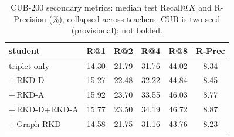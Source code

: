\documentclass[11pt,letterpaper]{article}
\begin{document}
\begin{table}[htbp]
    \centering\small
    \caption{CUB-200 secondary metrics: median test Recall@$K$ and R-Precision (\%),
             collapsed across teachers. CUB is two-seed (provisional); not bolded.}
    \label{tab:recall-cub}
    \begin{tabular}{lccccc}
        \toprule
        student & R@1 & R@2 & R@4 & R@8 & R-Prec \\
        \midrule
        triplet-only    & 14.30 & 21.79 & 31.76 & 44.02 & 8.34 \\
        +\,RKD-D        & 15.27 & 22.48 & 32.22 & 44.84 & 8.45 \\
        +\,RKD-A        & 15.92 & 23.70 & 33.55 & 46.03 & 8.77 \\
        +\,RKD-D+RKD-A  & 15.77 & 23.50 & 34.19 & 46.72 & 8.87 \\
        +\,Graph-RKD    & 14.58 & 21.75 & 31.16 & 43.76 & 8.23 \\
        \bottomrule
    \end{tabular}
\end{table}
\end{document}
